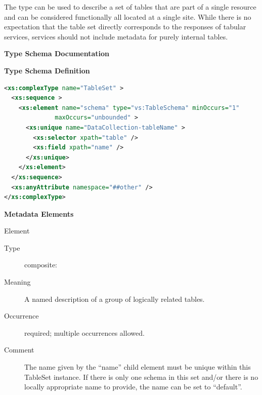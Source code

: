 \documentclass[11pt,a4paper]{ivoa}
\begin{document}
The  type can be used
to describe a set of tables that are part of a single resource and can
be considered functionally all located at a single site.  While there is
no expectation that the table set directly corresponds to the responses
of tabular services,
services should not include metadata for purely internal
tables.



\begin{generated}
\begingroup
      	\renewcommand*\descriptionlabel[1]{%
      	\hbox to 5.5em{\emph{#1}\hfil}}\vspace{2ex}\noindent\textbf{ Type Schema Documentation}


\vspace{1ex}\noindent\textbf{ Type Schema Definition}

\begin{lstlisting}[language=XML,basicstyle=\footnotesize]
<xs:complexType name="TableSet" >
  <xs:sequence >
    <xs:element name="schema" type="vs:TableSchema" minOccurs="1"
              maxOccurs="unbounded" >
      <xs:unique name="DataCollection-tableName" >
        <xs:selector xpath="table" />
        <xs:field xpath="name" />
      </xs:unique>
    </xs:element>
  </xs:sequence>
  <xs:anyAttribute namespace="##other" />
</xs:complexType>
\end{lstlisting}

\vspace{0.5ex}\noindent\textbf{ Metadata Elements}

\begingroup\small\begin{bigdescription}\item[Element \xmlel{schema}]
\begin{description}
\item[Type] composite: 
\item[Meaning] 
                A named description of a group of logically related tables.
              
\item[Occurrence] required; multiple occurrences allowed.
\item[Comment] 
                The name given by the “name” child element must
                be unique within this TableSet instance.  If there is
                only one schema in this set and/or there is no locally
                appropriate name to provide, the name can be set to
                “default”.  
              

\end{description}
\end{bigdescription}
\end{generated}
\end{document}
